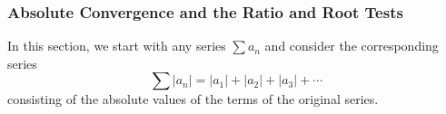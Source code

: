 \begin{frame}
\frametitle{Absolute Convergence and the Ratio and Root Tests}
In this section, we start with any series $\displaystyle \sum a_n$ and consider the corresponding series
\[
\sum |a_n| = |a_1| + |a_2| + |a_3| + \cdots
\]
consisting of the absolute values of the terms of the original series.
\end{frame}
